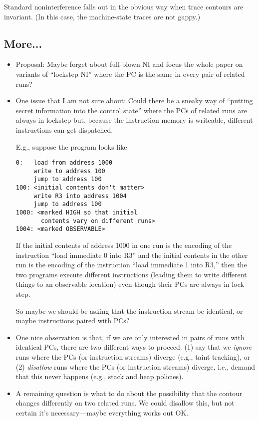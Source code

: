 \documentclass[conference]{IEEEtran}
\begin{document}
Standard noninterference falls out in the obvious way when trace contours are invariant. (In this case, the machine-state traces are not gappy.)

\iftext
\subsection{More...}
  \begin{itemize}
  \item Proposal: Maybe forget about full-blown NI and focus the whole paper
  on variants of ``lockstep NI'' where the PC is the same in every pair of
  related runs?
  \item One issue that I am not sure about: Could there be a sneaky way of
  ``putting secret information into the control state'' where the PCs of
  related runs are always in lockstep but, because the instruction memory is
  writeable, different instructions can get dispatched.

  E.g., suppose the program looks like
\begin{verbatim}
0:   load from address 1000
     write to address 100
     jump to address 100
100: <initial contents don't matter>
     write R3 into address 1004
     jump to address 100
1000: <marked HIGH so that initial
       contents vary on different runs>
1004: <marked OBSERVABLE>
\end{verbatim}
  If the initial contents of address 1000 in one run is the encoding of the
  instruction ``load immediate 0 into R3'' and the initial contents in the
  other run is the encoding of the instruction ``load immediate 1 into R3,''
  then the two programs execute different instructions (leading them to
  write different things to an observable location) even though their PCs
  are always in lock step.

  So maybe we should be asking that the instruction stream be
  identical, or maybe instructions paired with PCs?


  \item One nice observation is that, if we are only interested in pairs of
  runs with identical PCs, there are two different ways to proceed: (1) say
  that we {\em ignore} runs where the PCs (or instruction streams) diverge
  (e.g., taint tracking), or (2) {\em disallow} runs where the PCs (or
  instruction streams) diverge, i.e., demand that this never happens (e.g.,
  stack and heap policies).
  \item A remaining question is what to do about the possibility that the
  contour changes differently on two related runs.  We could disallow this,
  but not certain it's necessary---maybe everything works out OK.
  \end{itemize}
\fi
\end{document}
